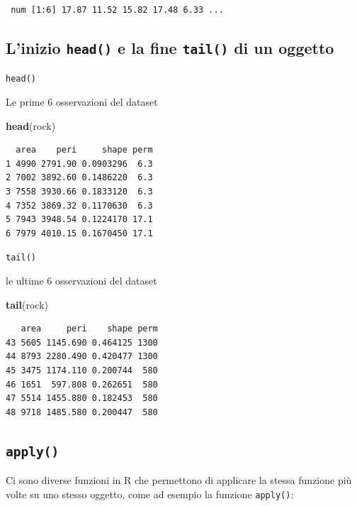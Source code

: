\documentclass[
  a4paper,
  DIV=11,
  numbers=noendperiod]{scrreprt}
\newenvironment{Shaded}{\begin{snugshade}}{\end{snugshade}}
\newcommand{\FunctionTok}[1]{\textcolor[rgb]{0.13,0.29,0.53}{\textbf{#1}}}
\newcommand{\NormalTok}[1]{#1}
\begin{document}
\begin{verbatim}
 num [1:6] 17.87 11.52 15.82 17.48 6.33 ...
\end{verbatim}

\subsection{\texorpdfstring{L'inizio \texttt{head()} e la fine
\texttt{tail()} di un
oggetto}{L'inizio head() e la fine tail() di un oggetto}}\label{linizio-head-e-la-fine-tail-di-un-oggetto}

\texttt{head()}

Le prime 6 osservazioni del dataset

\begin{Shaded}
\begin{Highlighting}[]
\FunctionTok{head}\NormalTok{(rock)}
\end{Highlighting}
\end{Shaded}

\begin{verbatim}
  area    peri     shape perm
1 4990 2791.90 0.0903296  6.3
2 7002 3892.60 0.1486220  6.3
3 7558 3930.66 0.1833120  6.3
4 7352 3869.32 0.1170630  6.3
5 7943 3948.54 0.1224170 17.1
6 7979 4010.15 0.1670450 17.1
\end{verbatim}

\texttt{tail()}

le ultime 6 osservazioni del dataset

\begin{Shaded}
\begin{Highlighting}[]
\FunctionTok{tail}\NormalTok{(rock)}
\end{Highlighting}
\end{Shaded}

\begin{verbatim}
   area     peri    shape perm
43 5605 1145.690 0.464125 1300
44 8793 2280.490 0.420477 1300
45 3475 1174.110 0.200744  580
46 1651  597.808 0.262651  580
47 5514 1455.880 0.182453  580
48 9718 1485.580 0.200447  580
\end{verbatim}

\subsection{\texorpdfstring{\texttt{apply()}}{apply()}}\label{apply}

Ci sono diverse funzioni in R che permettono di applicare la stessa
funzione più volte su uno stesso oggetto, come ad esempio la funzione
\texttt{apply()}:
\end{document}
